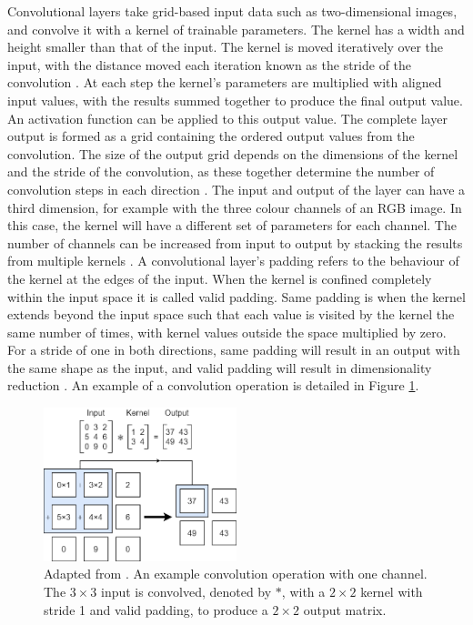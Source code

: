 \documentclass[12pt]{article}
\begin{document}
Convolutional layers take grid-based input data such as two-dimensional images, and convolve it with a kernel of trainable parameters. The kernel has a width and height smaller than that of the input. The kernel is moved iteratively over the input, with the distance moved each iteration known as the stride of the convolution \cite{Aghdam17}. At each step the kernel's parameters are multiplied with aligned input values, with the results summed together to produce the final output value. An activation function can be applied to this output value. The complete layer output is formed as a grid containing the ordered output values from the convolution. The size of the output grid depends on the dimensions of the kernel and the stride of the convolution, as these together determine the number of convolution steps in each direction \cite{Aghdam17}. The input and output of the layer can have a third dimension, for example with the three colour channels of an RGB image. In this case, the kernel will have a different set of parameters for each channel. The number of channels can be increased from input to output by stacking the results from multiple kernels \cite{Aghdam17}. A convolutional layer's padding refers to the behaviour of the kernel at the edges of the input. When the kernel is confined completely within the input space it is called valid padding. Same padding is when the kernel extends beyond the input space such that each value is visited by the kernel the same number of times, with kernel values outside the space multiplied by zero. For a stride of one in both directions, same padding will result in an output with the same shape as the input, and valid padding will result in dimensionality reduction \cite{Goodfellow16, Aghdam17}. An example of a convolution operation is detailed in Figure \ref{convop}.
\begin{figure}[!h]
\centering
\includegraphics[width=0.5\textwidth]{images/convolution.png}
\caption{Adapted from \cite{Goodfellow16}. An example convolution operation with one channel. The $3\times3$ input is convolved, denoted by $\ast$, with a $2\times2$ kernel with stride 1 and valid padding, to produce a $2\times2$ output matrix.}
\label{convop}
\end{figure}
\end{document}
